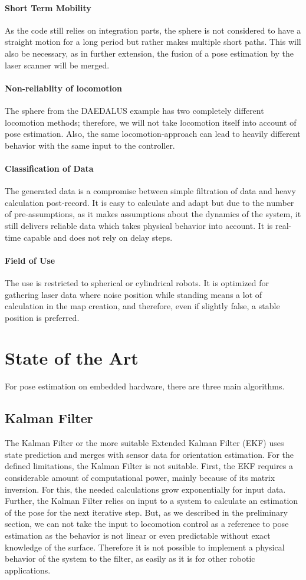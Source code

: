 \documentclass[letterpaper, 10 pt, conference]{ieeeconf}  %
\begin{document}
\paragraph*{Short Term Mobility}
As the code still relies on integration parts, the sphere is not considered to have a straight motion for a long period but rather makes multiple short paths. This will also be necessary, as in further extension, the fusion of a pose estimation by the laser scanner will be merged. 
\paragraph*{Non-reliablity of locomotion}
The sphere from the DAEDALUS example has two completely different locomotion methods; therefore, we will not take locomotion itself into account of pose estimation. Also, the same locomotion-approach can lead to heavily different behavior with the same input to the controller. \cite{c2}
\paragraph*{Classification of Data}
The generated data is a compromise between simple filtration of data and heavy calculation post-record. It is easy to calculate and adapt but due to the number of pre-assumptions, as it makes assumptions about the dynamics of the system, it still delivers reliable data which takes physical behavior into account. It is real-time capable and does not rely on delay steps.
\paragraph*{Field of Use}
The use is restricted to spherical or cylindrical robots. It is optimized for gathering laser data where noise position while standing means a lot of calculation in the map creation, and therefore, even if slightly false, a stable position is preferred.

\section{State of the Art}
\label{sec:SOA}
For pose estimation on embedded hardware, there are three main algorithms.
\subsection{Kalman Filter}
The Kalman Filter or the more suitable Extended Kalman Filter (EKF) uses state prediction and merges with sensor data for orientation estimation.
For the defined limitations, the Kalman Filter is not suitable.
First, the EKF requires a considerable amount of computational power, mainly because of its matrix inversion. For this, the needed calculations grow exponentially for input data.
Further, the Kalman Filter relies on input to a system to calculate an estimation of the pose for the next iterative step.
But, as we described in the preliminary section, we can not take the input to locomotion control as a reference to pose estimation as the behavior is not linear or even predictable without exact knowledge of the surface.
Therefore it is not possible to implement a physical behavior of the system to the filter, as easily as it is for other robotic applications.
\end{document}
